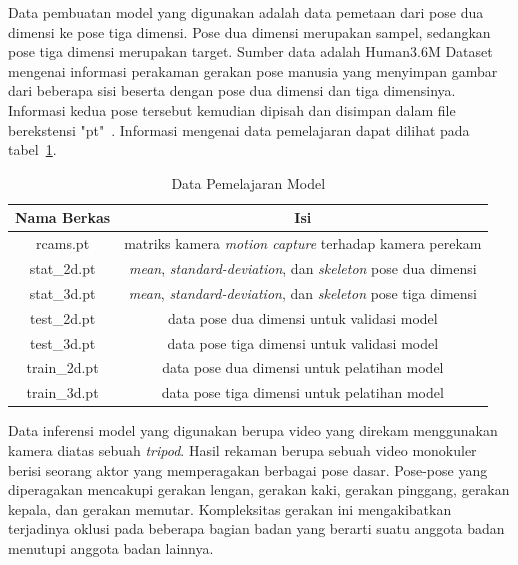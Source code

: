 Data pembuatan model yang digunakan adalah data pemetaan dari pose dua dimensi ke pose tiga dimensi.
Pose dua dimensi merupakan sampel, sedangkan pose tiga dimensi merupakan target. Sumber data adalah
Human3.6M Dataset mengenai informasi perakaman gerakan pose manusia yang menyimpan gambar dari
beberapa sisi beserta dengan pose dua dimensi dan tiga dimensinya. Informasi kedua pose tersebut
kemudian dipisah dan disimpan dalam file berekstensi "pt"~\cite{h36m_pami}.
Informasi mengenai data pemelajaran dapat dilihat pada tabel~\ref{tab:datapelatihanmodel}.
\begin{table}[htbp]
    \captionsetup{labelfont=bf, textfont=bf}
    \caption{Data Pemelajaran Model}
    \label{tab:datapelatihanmodel}
    \vspace{-20pt}
    \begin{center}
        \begin{tabular}{|c|c|}
            \hline
            Nama Berkas  & Isi                                                                                 \\ \hline
            rcams.pt     & matriks kamera \textit{motion capture} terhadap kamera perekam                      \\ \hline
            stat\_2d.pt  & \textit{mean}, \textit{standard-deviation}, dan \textit{skeleton} pose dua dimensi  \\ \hline
            stat\_3d.pt  & \textit{mean}, \textit{standard-deviation}, dan \textit{skeleton} pose tiga dimensi \\ \hline
            test\_2d.pt  & data pose dua dimensi untuk validasi model                                          \\ \hline
            test\_3d.pt  & data pose tiga dimensi untuk validasi model                                         \\ \hline
            train\_2d.pt & data pose dua dimensi untuk pelatihan model                                         \\ \hline
            train\_3d.pt & data pose tiga dimensi untuk pelatihan model                                        \\ \hline
        \end{tabular}
    \end{center}
    \vspace{-10pt}
\end{table}

Data inferensi model yang digunakan berupa video yang direkam menggunakan kamera diatas sebuah
\textit{tripod}. Hasil rekaman berupa sebuah video monokuler berisi seorang aktor yang memperagakan
berbagai pose dasar. Pose-pose yang diperagakan mencakupi gerakan lengan, gerakan kaki, gerakan pinggang,
gerakan kepala, dan gerakan memutar. Kompleksitas gerakan ini mengakibatkan terjadinya oklusi pada
beberapa bagian badan yang berarti suatu anggota badan menutupi anggota badan lainnya.

